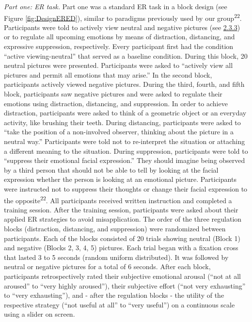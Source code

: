 \documentclass[
  man,floatsintext]{apa6}
\begin{document}
\emph{Part one: ER task.} Part one was a standard ER task in a block design (see Figure \ref{fig:DesignERED}), similar to paradigms previously used by our group\textsuperscript{22}.
Participants were told to actively view neutral and negative pictures (see \protect\hyperlink{ux5cux23stimuli}{2.3.3}) or to regulate all upcoming emotions by means of distraction, distancing, and expressive suppression, respectively.
Every participant first had the condition ``active viewing-neutral'' that served as a baseline condition.
During this block, 20 neutral pictures were presented.
Participants were asked to ``actively view all pictures and permit all emotions that may arise.''
In the second block, participants actively viewed negative pictures.
During the third, fourth, and fifth block, participants saw negative pictures and were asked to regulate their emotions using distraction, distancing, and suppression.
In order to achieve distraction, participants were asked to think of a geometric object or an everyday activity, like brushing their teeth.
During distancing, participants were asked to ``take the position of a non-involved observer, thinking about the picture in a neutral way.''
Participants were told not to re-interpret the situation or attaching a different meaning to the situation.
During suppression, participants were told to ``suppress their emotional facial expression.''
They should imagine being observed by a third person that should not be able to tell by looking at the facial expression whether the person is looking at an emotional picture.
Participants were instructed not to suppress their thoughts or change their facial expression to the opposite\textsuperscript{22}.
All participants received written instruction and completed a training session.
After the training session, participants were asked about their applied ER strategies to avoid misapplication.
The order of the three regulation blocks (distraction, distancing, and suppression) were randomized between participants.
Each of the blocks consisted of 20 trials showing neutral (Block 1) and negative (Blocks 2, 3, 4, 5) pictures.
Each trial began with a fixation cross that lasted 3 to 5 seconds (random uniform distributed).
It was followed by neutral or negative pictures for a total of 6 seconds.
After each block, participants retrospectively rated their subjective emotional arousal (``not at all aroused'' to ``very highly aroused''), their subjective effort (``not very exhausting'' to ``very exhausting''), and - after the regulation blocks - the utility of the respective strategy (``not useful at all'' to ``very useful'') on a continuous scale using a slider on screen.
\end{document}
